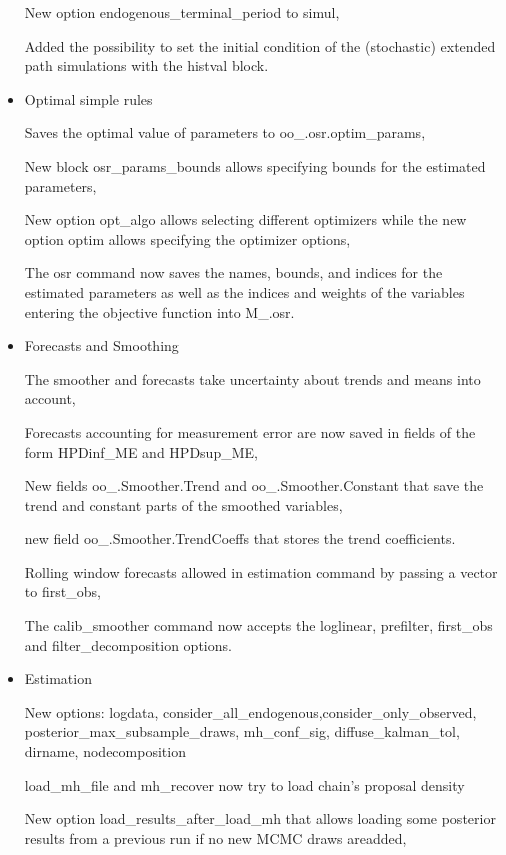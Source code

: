 \documentclass[cn,10pt,math=newtx,citestyle=gb7714-2015,bibstyle=gb7714-2015]{elegantbook}
\begin{document}
\begin{itemize}
		
		New option endogenous\_terminal\_period to simul,
		
		
		Added the possibility to set the initial condition of the (stochastic) extended path simulations with the histval block.
		
		\item Optimal simple rules
		
		
		Saves the optimal value of parameters to oo\_.osr.optim\_params,
		
		
		New block osr\_params\_bounds allows specifying bounds for the estimated parameters,
		
		
		New option opt\_algo allows selecting different optimizers while the new option optim allows specifying the optimizer options,
		
		
		The osr command now saves the names, bounds, and indices for the estimated parameters as well as the indices and weights of the variables entering the objective function into M\_.osr.
		
		\item Forecasts and Smoothing
		
		
		The smoother and forecasts take uncertainty about trends and means into account,
		
		
		Forecasts accounting for measurement error are now saved in fields of the form HPDinf\_ME and HPDsup\_ME,
		
		
		New fields oo\_.Smoother.Trend and oo\_.Smoother.Constant that save the trend and constant parts of the smoothed variables,
		
		
		new field oo\_.Smoother.TrendCoeffs that stores the trend coefficients.
		
		
		Rolling window forecasts allowed in estimation command by passing a vector to first\_obs,
		
		
		The calib\_smoother command now accepts the loglinear, prefilter, first\_obs and filter\_decomposition options.
		\item Estimation
		
		
		New options: logdata, consider\_all\_endogenous,consider\_only\_observed, posterior\_max\_subsample\_draws, mh\_conf\_sig, diffuse\_kalman\_tol, dirname, nodecomposition
		
		
		load\_mh\_file and mh\_recover now try to load chain's proposal density\,
		
		
		New option load\_results\_after\_load\_mh that allows loading some posterior results from a previous run if no new MCMC draws areadded,
		

\end{itemize}
\end{document}
